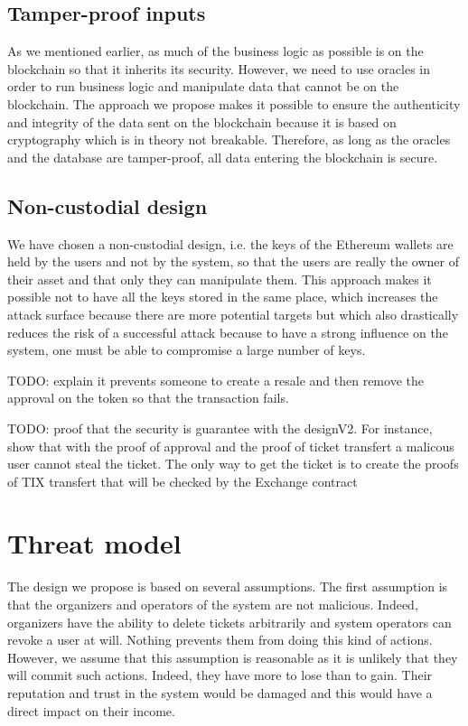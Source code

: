 \documentclass[a4paper,11pt,oneside]{report}
\begin{document}
\subsection{Tamper-proof inputs}
As we mentioned earlier, as much of the business logic as possible is on the blockchain so that it inherits its security. However, we need to use oracles in order to run business logic and manipulate data that cannot be on the blockchain. The approach we propose makes it possible to ensure the authenticity and integrity of the data sent on the blockchain because it is based on cryptography which is in theory not breakable. Therefore, as long as the oracles and the database are tamper-proof, all data entering the blockchain is secure.

\subsection{Non-custodial design}
We have chosen a non-custodial design, i.e. the keys of the Ethereum wallets are held by the users and not by the system, so that the users are really the owner of their asset and that only they can manipulate them. This approach makes it possible not to have all the keys stored in the same place, which increases the attack surface because there are more potential targets but which also drastically reduces the risk of a successful attack because to have a strong influence on the system, one must be able to compromise a large number of keys.

TODO: explain it prevents someone to create a resale and then remove the approval on the token so that the transaction fails.

TODO: proof that the security is guarantee with the designV2. For instance, show that with the proof of approval and the proof of ticket transfert a malicous user cannot steal the ticket. The only way to get the ticket is to create the proofs of TIX transfert that will be checked by the Exchange contract

\section{Threat model}
The design we propose is based on several assumptions. The first assumption is that the organizers and operators of the system are not malicious. Indeed, organizers have the ability to delete tickets arbitrarily and system operators can revoke a user at will. Nothing prevents them from doing this kind of actions. However, we assume that this assumption is reasonable as it is unlikely that they will commit such actions. Indeed, they have more to lose than to gain. Their reputation and trust in the system would be damaged and this would have a direct impact on their income.
\end{document}
